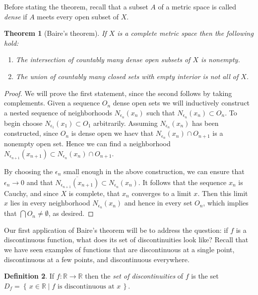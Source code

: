 \documentclass[11pt,oneside]{amsbook}
\newcommand{\set}[1]{\left\{\,#1\,\right\}}
\newcommand{\R}{\mathbb R}
\theoremstyle{definition}
\theoremstyle{plain}
\newtheorem{theorem}{Theorem}[section]
\theoremstyle{definition}
\newtheorem{definition}[theorem]{Definition}
\theoremstyle{remark}
\numberwithin{equation}{section}
\numberwithin{figure}{section}
\begin{document}
Before stating the theorem, recall that a subset $A$ of a metric space is called \emph{dense} if $A$ meets every open subset of $X$.

\begin{theorem}[Baire's theorem]
  If $X$ is a complete metric space then the following hold:
  \begin{enumerate}
  \item The intersection of countably many dense open subsets of $X$ is nonempty.
  \item The union of countably many closed sets with empty interior is not all of $X$.
  \end{enumerate}
\end{theorem}

\begin{proof}
  We will prove the first statement, since the second follows by taking complements. Given a sequence $O_n$ dense open sets we will inductively construct a nested sequence of neighborhoods $N_{\epsilon_n}(x_n)$ such that $N_{\epsilon_n}(x_n)\subset O_n$. To begin choose $N_{\epsilon_1}(x_1)\subset O_1$ arbitrarily. Assuming $N_{\epsilon_n}(x_n)$ has been constructed, since $O_n$ is dense open we haev that $N_{\epsilon_n}(x_n)\cap O_{n+1}$ is a nonempty open set. Hence we can find a neighborhood $N_{\epsilon_{n+1}}(x_{n+1})\subset N_{\epsilon_n}(x_n)\cap O_{n+1}$.

  By choosing the $\epsilon_n$ small enough in the above construction, we can ensure that $\epsilon_n\to0$ and that $\overline{N_{\epsilon_{n+1}}(x_{n+1})}\subset N_{\epsilon_n}(x_n)$. It follows that the sequence $x_n$ is Cauchy, and since $X$ is complete, that $x_n$ converges to a limit $x$. Then this limit $x$ lies in every neighborhood $N_{\epsilon_n}(x_n)$ and hence in every set $O_n$, which implies that $\bigcap O_n\neq\emptyset$, as desired.
\end{proof}

Our first application of Baire's theorem will be to address the question: if $f$ is a discontinuous function, what does its set of discontinuities look like? Recall that we have seen examples of functions that are discontinuous at a single point, discontinuous at a few points, and discontinuous everywhere.

\begin{definition}
  If $f\colon\R\to\R$ then the \emph{set of discontinuities} of $f$ is the set $D_f=\set{x\in\R\mid\text{$f$ is discontinuous at $x$}}$.
\end{definition}
\end{document}
